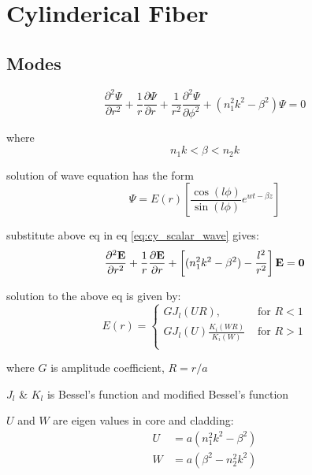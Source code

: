 \documentclass[12pt, onecolumn]{article}
\begin{document}
\section{Cylinderical Fiber}
    \subsection{Modes}
        \begin{equation}
            \frac{\partial^2 \Psi}{\partial r^2} 
            + \frac{1}{r} \frac{\partial \Psi}{\partial r} 
            + \frac{1}{r^2} \frac{\partial^2 \Psi}{\partial \phi^2} 
            + (n_1^2 k^2 - \beta^2)\Psi = 0 
            \label{eq:cy_scalar_wave}
        \end{equation}

        where
        \[
            n_1 k < \beta < n_2 k
        \]

        solution of wave equation has the form
        \begin{equation}
            \Psi = E(r) \left[ \frac{\cos(l\phi)}{\sin(l\phi)} e^{wt-\beta z} \right]
        \end{equation}
        
        substitute above eq in eq \ref{eq:cy_scalar_wave} gives:
        \begin{equation}
            \frac{\partial^2 \bf{E}}{\partial r^2} 
            + \frac{1}{r} \frac{\partial \bf{E}}{\partial r} 
            + \left[(n_1^2 k^2 - \beta^2) - \frac{l^2}{r^2} \right]\bf{E} = 0
        \end{equation}

        solution to the above eq is given by:
        \begin{equation}
            E(r) =
            \begin{cases}
                GJ_l(UR), &\text{ for } R < 1 \\
                GJ_l(U) \displaystyle\frac{K_i(WR)}{K_i(W)} &\text{ for } R>1\\ 
            \end{cases}
            \label{eq:e_field}
        \end{equation}
        
        where $G$ is amplitude coefficient, $ R = r/a $

        $J_l$ \& $K_l$ is Bessel's function and modified Bessel's function

       $U$ and $W$ are eigen values in core and cladding:
        \begin{equation}
            \begin{aligned}
                U &= a(n_1^2k^2 - \beta^2) \\
                W &= a(\beta^2 - n_2^2k^2) \\
            \end{aligned}
            \label{eq:eigen_val}
        \end{equation}
\end{document}
